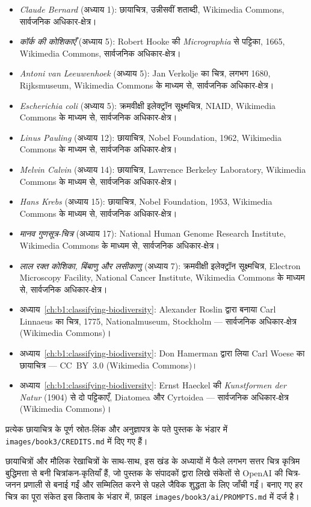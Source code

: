 \begin{itemize}
  \item \emph{Claude Bernard} (अध्याय 1): छायाचित्र, उन्नीसवीं शताब्दी,
        Wikimedia Commons, सार्वजनिक अधिकार-क्षेत्र।
  \item \emph{कॉर्क की कोशिकाएँ} (अध्याय 5): Robert Hooke की
        \emph{Micrographia} से पट्टिका, 1665, Wikimedia Commons,
        सार्वजनिक अधिकार-क्षेत्र।
  \item \emph{Antoni van Leeuwenhoek} (अध्याय 5): Jan Verkolje का
        चित्र, लगभग 1680, Rijksmuseum, Wikimedia Commons के माध्यम से,
        सार्वजनिक अधिकार-क्षेत्र।
  \item \emph{Escherichia coli} (अध्याय 5): क्रमवीक्षी इलेक्ट्रॉन
        सूक्ष्मचित्र, NIAID, Wikimedia Commons के माध्यम से,
        सार्वजनिक अधिकार-क्षेत्र।
  \item \emph{Linus Pauling} (अध्याय 12): छायाचित्र, Nobel Foundation,
        1962, Wikimedia Commons के माध्यम से, सार्वजनिक अधिकार-क्षेत्र।
  \item \emph{Melvin Calvin} (अध्याय 14): छायाचित्र, Lawrence Berkeley
        Laboratory, Wikimedia Commons के माध्यम से, सार्वजनिक
        अधिकार-क्षेत्र।
  \item \emph{Hans Krebs} (अध्याय 15): छायाचित्र, Nobel Foundation,
        1953, Wikimedia Commons के माध्यम से, सार्वजनिक अधिकार-क्षेत्र।
  \item \emph{मानव गुणसूत्र-चित्र} (अध्याय 17): National Human Genome
        Research Institute, Wikimedia Commons के माध्यम से, सार्वजनिक
        अधिकार-क्षेत्र।
  \item \emph{लाल रक्त कोशिका, बिंबाणु और लसीकाणु} (अध्याय 7):
        क्रमवीक्षी इलेक्ट्रॉन सूक्ष्मचित्र, Electron Microscopy
        Facility, National Cancer Institute, Wikimedia Commons के
        माध्यम से, सार्वजनिक अधिकार-क्षेत्र।
  \item अध्याय~\ref{ch:b1:classifying-biodiversity}: Alexander Roslin द्वारा बनाया Carl Linnaeus का चित्र, 1775, Nationalmuseum, Stockholm --- सार्वजनिक अधिकार-क्षेत्र (Wikimedia Commons)।
  \item अध्याय~\ref{ch:b1:classifying-biodiversity}: Don Hamerman द्वारा लिया Carl Woese का छायाचित्र --- CC~BY~3.0 (Wikimedia Commons)।
  \item अध्याय~\ref{ch:b1:classifying-biodiversity}: Ernst Haeckel की \emph{Kunstformen der Natur} (1904) से दो पट्टिकाएँ, Diatomea और Cyrtoidea --- सार्वजनिक अधिकार-क्षेत्र (Wikimedia Commons)।
\end{itemize}

प्रत्येक छायाचित्र के पूर्ण स्रोत-लिंक और अनुज्ञापत्र के पते पुस्तक के
भंडार में \texttt{images/\allowbreak book3/\allowbreak CREDITS.md} में दिए गए हैं।

\bigskip
छायाचित्रों और मौलिक रेखाचित्रों के साथ-साथ, इस खंड के अध्यायों में फैले
लगभग सत्तर चित्र कृत्रिम बुद्धिमत्ता से बनी चित्रांकन-कृतियाँ हैं, जो
पुस्तक के संपादकों द्वारा लिखे संकेतों से OpenAI की चित्र-जनन प्रणाली से
बनाई गईं और सम्मिलित करने से पहले जैविक शुद्धता के लिए जाँची गईं।
बनाए गए हर चित्र का पूरा संकेत इस किताब के भंडार में, फ़ाइल
\texttt{images/\allowbreak book3/\allowbreak ai/\allowbreak PROMPTS.md} में दर्ज है।
\par\endgroup
\clearpage

